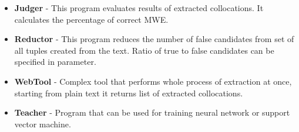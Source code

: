 \begin{itemize}
    \item \textbf{Judger} - This program evaluates results of extracted collocations. It calculates the percentage of correct MWE.
 
    \item \textbf{Reductor} - This program reduces the number of false candidates from set of all tuples created from the text. 
    Ratio of true to false candidates can be specified in parameter.
 
    \item \textbf{WebTool} - Complex tool that performs whole process of extraction at once, starting from plain text 
    it returns list of extracted collocations.
 
    \item \textbf{Teacher} - Program that can be used for training neural network or support vector machine.
 
    
\end{itemize}

